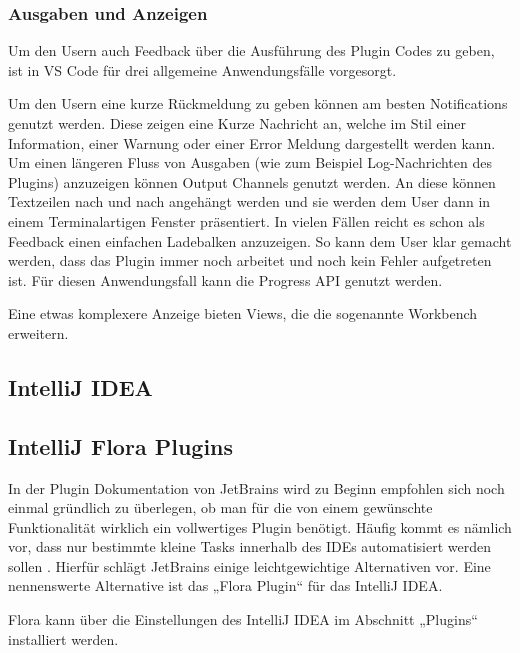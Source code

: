 \subsubsection{Ausgaben und Anzeigen}
  Um den Usern auch Feedback über die Ausführung des Plugin Codes zu geben, 
  ist in VS Code für drei allgemeine Anwendungsfälle vorgesorgt. 
  
  Um den Usern eine kurze 
  Rückmeldung zu geben können am besten Notifications genutzt werden. Diese zeigen eine Kurze 
  Nachricht an, welche im Stil einer Information, einer Warnung oder einer Error Meldung 
  dargestellt werden kann. Um einen längeren Fluss von Ausgaben (wie zum Beispiel Log-Nachrichten 
  des Plugins) anzuzeigen können Output Channels genutzt werden. An diese können Textzeilen nach 
  und nach angehängt werden und sie werden dem User dann in einem Terminalartigen Fenster präsentiert. 
  In vielen Fällen reicht es schon als Feedback einen einfachen Ladebalken anzuzeigen. So kann dem 
  User klar gemacht werden, dass das Plugin immer noch arbeitet und noch kein Fehler aufgetreten 
  ist. Für diesen Anwendungsfall kann die Progress API genutzt werden.

  Eine etwas komplexere Anzeige bieten Views, die die sogenannte Workbench erweitern.

\subsection{IntelliJ IDEA}



\subsection{IntelliJ Flora Plugins}

In der Plugin Dokumentation von JetBrains wird zu Beginn 
empfohlen sich noch einmal gründlich zu überlegen, ob man 
für die von einem gewünschte Funktionalität wirklich ein 
vollwertiges Plugin benötigt. Häufig kommt es nämlich vor, 
dass nur bestimmte kleine Tasks innerhalb des IDEs 
automatisiert werden sollen \cite{IntelliJSDKDocumentation}. Hierfür schlägt JetBrains 
einige leichtgewichtige Alternativen vor. Eine nennenswerte 
Alternative ist das „Flora Plugin“ für das IntelliJ IDEA. 

Flora kann über die Einstellungen des IntelliJ IDEA 
im Abschnitt „Plugins“ installiert werden.


